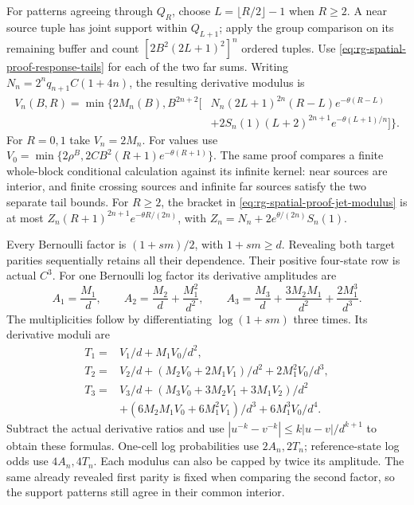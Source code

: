 For patterns agreeing through \(Q_R\), choose
\(L=\lfloor R/2\rfloor-1\) when \(R\ge2\). A near source tuple has
joint support within \(Q_{L+1}\); apply the group comparison on its
remaining buffer and count \([2B^2(2L+1)^2]^n\) ordered tuples. Use
\cref{eq:rg-spatial-proof-response-tails} for each of the two far sums.
Writing \(N_n=2^nq_{n+1}C(1+4n)\), the resulting derivative modulus is
\begin{equation}
\begin{split}
 V_n(B,R)=\min\bigl\{2M_n(B),B^{2n+2}\bigl[
 &N_n(2L+1)^{2n}(R-L)e^{-\theta(R-L)}\\
 &+2S_n(1)(L+2)^{2n+1}e^{-\theta(L+1)/n}\bigr]\bigr\}.
\end{split}
 \label{eq:rg-spatial-proof-jet-modulus}
\end{equation}
For \(R=0,1\) take \(V_n=2M_n\). For values use
\(V_0=\min\{2\rho^B,2CB^2(R+1)e^{-\theta(R+1)}\}\).
The same proof compares a finite whole-block conditional calculation
against its infinite kernel: near sources are interior, and finite
crossing sources and infinite far sources satisfy the two separate tail
bounds. For \(R\ge2\), the bracket in
\cref{eq:rg-spatial-proof-jet-modulus} is at most
\(Z_n(R+1)^{2n+1}e^{-\theta R/(2n)}\), with
\(Z_n=N_n+2e^{\theta/(2n)}S_n(1)\).

Every Bernoulli factor is \((1+s m)/2\), with \(1+s m\ge d\).
Revealing both target parities sequentially retains all their dependence.
Their positive four-state row is actual \(C^3\). For one Bernoulli log
factor its derivative amplitudes are
\begin{equation}
 A_1=\frac{M_1}{d},\qquad
 A_2=\frac{M_2}{d}+\frac{M_1^2}{d^2},\qquad
 A_3=\frac{M_3}{d}+\frac{3M_2M_1}{d^2}+\frac{2M_1^3}{d^3}.
 \label{eq:rg-spatial-proof-log-jet-amplitudes}
\end{equation}
The multiplicities follow by differentiating \(\log(1+s m)\) three
times. Its derivative moduli are
\begin{equation}
 \begin{split}
 T_1={}&V_1/d+M_1V_0/d^2,\\
 T_2={}&V_2/d+(M_2V_0+2M_1V_1)/d^2+2M_1^2V_0/d^3,\\
 T_3={}&V_3/d+(M_3V_0+3M_2V_1+3M_1V_2)/d^2\\
       &+(6M_2M_1V_0+6M_1^2V_1)/d^3+6M_1^3V_0/d^4.
 \end{split}
 \label{eq:rg-spatial-proof-log-jet-moduli}
\end{equation}
Subtract the actual derivative ratios and use
\(|u^{-k}-v^{-k}|\le k|u-v|/d^{k+1}\) to obtain these formulas.
One-cell log probabilities use \(2A_n,2T_n\); reference-state log odds
use \(4A_n,4T_n\). Each modulus can also be capped by twice its
amplitude. The same already revealed first parity is fixed when comparing
the second factor, so the support patterns still agree in their common
interior.

